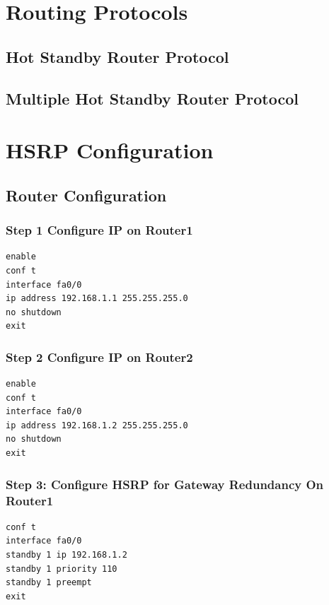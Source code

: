 \documentclass[12pt]{report}
\begin{document}
\chapter{Routing Protocols}
\section{Hot Standby Router Protocol}
\section{Multiple Hot Standby Router Protocol}
\newpage

\chapter{HSRP Configuration}

\section{Router Configuration}
\subsection*{Step 1 Configure IP on Router1}
\begin{Verbatim}[fontsize=\small, formatcom=\hackfont\color{black}, frame=single]
enable
conf t
interface fa0/0
ip address 192.168.1.1 255.255.255.0
no shutdown
exit
\end{Verbatim}

\subsection*{Step 2 Configure IP on Router2}
\begin{Verbatim}[fontsize=\small, formatcom=\hackfont\color{black}, frame=single]
enable
conf t
interface fa0/0
ip address 192.168.1.2 255.255.255.0
no shutdown
exit
\end{Verbatim}

\subsection*{Step 3: Configure HSRP for Gateway Redundancy On Router1}
\begin{Verbatim}[fontsize=\small, formatcom=\hackfont\color{black}, frame=single]
conf t
interface fa0/0
standby 1 ip 192.168.1.2
standby 1 priority 110
standby 1 preempt
exit
\end{Verbatim}
\end{document}
